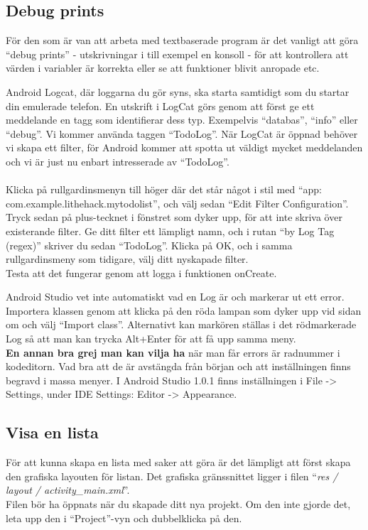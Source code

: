 \documentclass[11 pt, titlepage]{article} %
\begin{document}
\subsection{Debug prints}
För den som är van att arbeta med textbaserade program är det vanligt att göra “debug prints” - utskrivningar i till exempel en konsoll - för att kontrollera att värden i variabler är korrekta eller se att funktioner blivit anropade etc. 

Android Logcat, där loggarna du gör syns, ska starta samtidigt som du startar din emulerade telefon.
En utskrift i LogCat görs genom att först ge ett meddelande en tagg som identifierar dess typ. Exempelvis “databas”, “info” eller “debug”. Vi kommer använda taggen “TodoLog”. När LogCat är öppnad behöver vi skapa ett filter, för Android kommer att spotta ut väldigt mycket meddelanden och vi är just nu enbart intresserade av “TodoLog”.\\
\\
Klicka på rullgardinsmenyn till höger där det står något i stil med ``app: com.example.lithehack.mytodolist'', och välj sedan ``Edit Filter Configuration''. Tryck sedan på plus-tecknet i fönstret som dyker upp, för att inte skriva över existerande filter. Ge ditt filter ett lämpligt namn, och i rutan ``by Log Tag (regex)'' skriver du sedan ``TodoLog''. Klicka på OK, och i samma rullgardinsmeny som tidigare, välj ditt nyskapade filter.\\

Testa att det fungerar genom att logga i funktionen onCreate.


Android Studio vet inte automatiskt vad en Log är och markerar ut ett error. Importera klassen genom att klicka på den röda lampan som dyker upp vid sidan om och välj “Import class”. Alternativt kan markören ställas i det rödmarkerade Log så att man kan trycka Alt+Enter för att få upp samma meny. \\

\textbf{En annan bra grej man kan vilja ha} när man får errors är radnummer i kodeditorn. Vad bra att de är avstängda från början och att inställningen finns begravd i massa menyer. I Android Studio 1.0.1 finns inställningen i File -> Settings, under IDE Settings: Editor -> Appearance. 

\subsection{Visa en lista}
För att kunna skapa en lista med saker att göra är det lämpligt att först skapa den grafiska layouten för listan. Det grafiska gränssnittet ligger i filen “\textit{res / layout / activity\_main.xml}”.\\
Filen bör ha öppnats när du skapade ditt nya projekt. Om den inte gjorde det, leta upp den i ``Project''-vyn och dubbelklicka på den. \\
\end{document}
